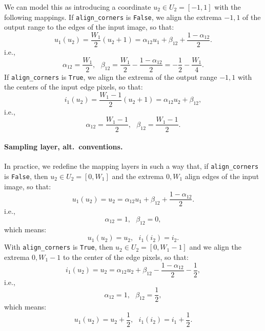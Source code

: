 We can model this as introducing a coordinate $u_2 \in U_2 = [-1,1]$ with the following mappings.
If \texttt{align\_corners} is \texttt{False}, we align the extrema $-1,1$ of the output range to the edges of the input image, so that:
$$
u_1(u_2)
=
\frac{W_1}{2} (u_2 + 1)
=
\alpha_{12} u_1
+ \beta_{12}
+ \frac{1 - \alpha_{12}}{2}.
$$
i.e.,
$$
\alpha_{12} = \frac{W_1}{2},~~~
\beta_{12} = \frac{W_1}{2} - \frac{1 - \alpha_{12}}{2} = - \frac{1}{2} - \frac{W_1}{4}.
$$
If \texttt{align\_corners} is \texttt{True}, we align the extrema of the output range $-1, 1$ with the centers of the input edge pixels, so that:
$$
i_1(u_2)
=
\frac{W_1-1}{2} (u_2 + 1)
=
\alpha_{12}u_2 + \beta_{12},
$$
i.e.,
$$
\alpha_{12} = \frac{W_1 - 1}{2},~~~
\beta_{12} = \frac{W_1 - 1}{2}.
$$

\paragraph{Sampling layer, alt.~conventions.}

In practice, we redefine the mapping layers in such a way that, if \texttt{align\_corners} is \texttt{False}, then $u_2 \in U_2 = [0, W_1]$ and the extrema $0, W_1$ align edges of the input image, so that:
$$
u_1(u_2)
=
u_2
=
\alpha_{12} u_1
+ \beta_{12}
+ \frac{1 - \alpha_{12}}{2}.
$$
i.e.,
$$
\alpha_{12} = 1,~~~
\beta_{12} = 0,
$$
which means:
$$
u_1(u_2) = u_2, ~~~
i_1(i_2) = i_2.
$$
With \texttt{align\_corners} is \texttt{True}, then $u_2 \in U_2 = [0, W_1-1]$ and we align the extrema $0, W_1-1$ to the center of the edge pixels, so that:
$$
i_1(u_2)
=
u_2
=
\alpha_{12}u_2 + \beta_{12} - \frac{1-\alpha_{12}}{2} - \frac{1}{2},
$$
i.e.,
$$
\alpha_{12} = 1,~~~
\beta_{12} = \frac{1}{2},
$$
which means:
$$
u_1(u_2) = u_2 + \frac{1}{2},~~~
i_1(i_2) = i_1 + \frac{1}{2}.
$$